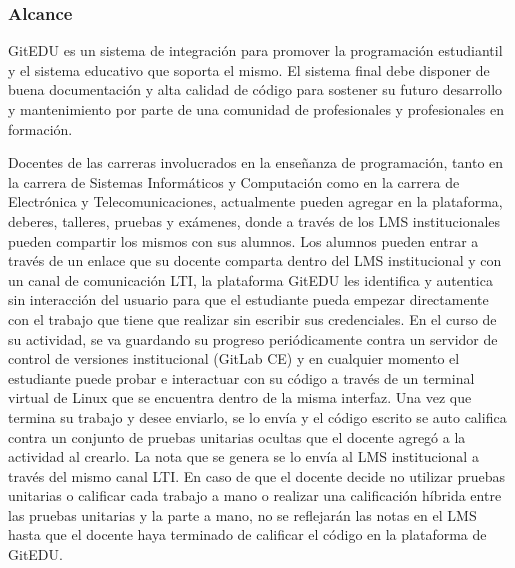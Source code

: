 \subsubsection{Alcance}
GitEDU es un sistema de integración para promover la programación estudiantil y el sistema educativo que soporta el mismo. El sistema final debe disponer de buena documentación y alta calidad de código para sostener su futuro desarrollo y mantenimiento por parte de una comunidad de profesionales y profesionales en formación.

      
Docentes de las carreras involucrados en la enseñanza de programación, tanto en la carrera de Sistemas Informáticos y Computación como en la carrera de Electrónica y Telecomunicaciones, actualmente pueden agregar en la plataforma, deberes, talleres, pruebas y exámenes, donde a través de los LMS  institucionales pueden compartir los mismos con sus alumnos. Los alumnos pueden entrar a través de un enlace que su docente comparta dentro del LMS  institucional y con un canal de comunicación LTI, la plataforma GitEDU les identifica y autentica sin interacción del usuario para que el estudiante pueda empezar directamente con el trabajo que tiene que realizar sin escribir sus credenciales. En el curso de su actividad, se va guardando su progreso periódicamente contra un servidor de control de versiones institucional (GitLab CE) y en cualquier momento el estudiante puede probar e interactuar con su código a través de un terminal virtual de Linux que se encuentra dentro de la misma interfaz. Una vez que termina su trabajo y desee enviarlo, se lo envía y el código escrito se auto califica contra un conjunto de pruebas unitarias ocultas que el docente agregó a la actividad al crearlo. La nota que se genera se lo envía al LMS  institucional a través del mismo canal LTI. En caso de que el docente decide no utilizar pruebas unitarias o calificar cada trabajo a mano o realizar una calificación híbrida entre las pruebas unitarias y la parte a mano, no se reflejarán las notas en el LMS  hasta que el docente haya terminado de calificar el código en la plataforma de GitEDU.

